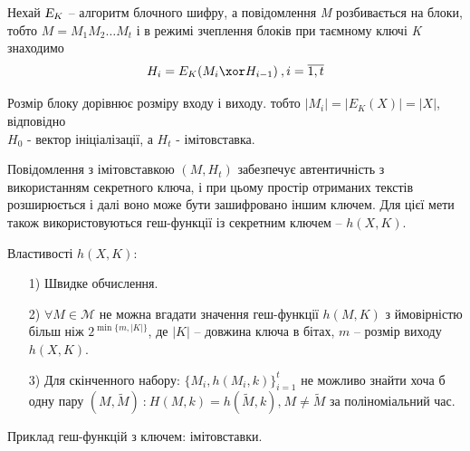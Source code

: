 Нехай $ \textsl{E}_K $ -- алгоритм блочного шифру, а повідомлення 
\textsl{M} розбивається на блоки, \\
тобто $ M = M_1 M_2 \dots M_t $ і в режимі зчеплення блоків при таємному ключі \textsl{K} знаходимо
\begin{equation}
H_i = E_K(M_i \xor H_{i-1}) \:, i=\overline{1,t}
\end{equation}

Розмір блоку дорівнює розміру входу і виходу. тобто
$ |M_i | = |E_K(X)| = |X| $, відповідно \\
$ H_0 $ - вектор ініціалізації, а $ H_t $ - імітовставка. \par
Повідомлення з імітовставкою $ (M, H_t) $ забезпечує автентичність з 
використанням секретного ключа, і при цьому простір отриманих текстів 
розширюється і далі воно може бути зашифровано іншим ключем. Для цієї мети 
також використовуються геш-функції із секретним ключем -- $h(X,K)$.  
\\ \par
Властивості $h(X,K)$:
\begin{enumerate}
\item[1)] Швидке обчислення.
\item[2)] $ \forall M \in \mathcal{M} $ не можна вгадати значення 
геш-функції $h(M,K)$ з ймовірністю більш ніж $ 2^{\min\{m,|K|\}} $, 
де $|K|$ -- довжина ключа в бітах, $m$ -- розмір виходу $h(X,K)$.
\item[3)] Для скінченного набору: $ \{M_i, h(M_i, k) \}_ {i = 1}^ t $ не можливо знайти хоча б одну пару
 $ (M, \widetilde{M}) \: \text {:} \: H(M, k) = h(\widetilde {M}, k) \text{,}\: M \neq \widetilde {M} $ за поліноміальний час.
 
\end{enumerate}
 
Приклад геш-функцій з ключем: імітовставки.


